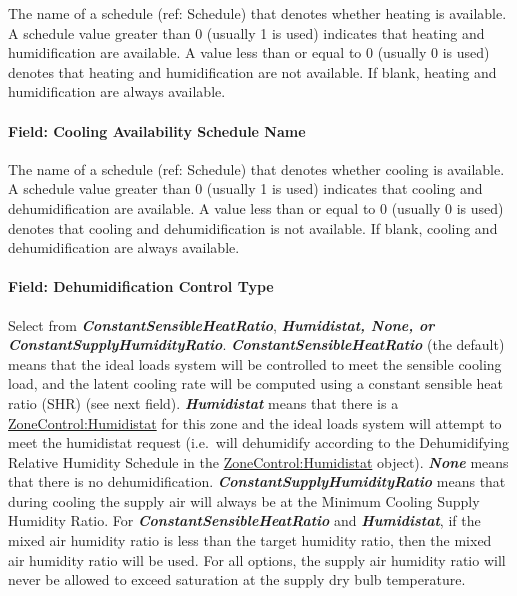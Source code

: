 The name of a schedule (ref: Schedule) that denotes whether heating is available. A schedule value greater than 0 (usually 1 is used) indicates that heating and humidification are available. A value less than or equal to 0 (usually 0 is used) denotes that heating and humidification are not available. If blank, heating and humidification are always available.

\paragraph{Field: Cooling Availability Schedule Name}\label{field-cooling-availability-schedule-name-001}

The name of a schedule (ref: Schedule) that denotes whether cooling is available. A schedule value greater than 0 (usually 1 is used) indicates that cooling and dehumidification are available. A value less than or equal to 0 (usually 0 is used) denotes that cooling and dehumidification is not available. If blank, cooling and dehumidification are always available.

\paragraph{Field: Dehumidification Control Type}\label{field-dehumidification-control-type-002}

Select from \textbf{\emph{ConstantSensibleHeatRatio}}, \textbf{\emph{Humidistat, None, or ConstantSupplyHumidityRatio}}. \textbf{\emph{ConstantSensibleHeatRatio}} (the default) means that the ideal loads system will be controlled to meet the sensible cooling load, and the latent cooling rate will be computed using a constant sensible heat ratio (SHR) (see next field). \textbf{\emph{Humidistat}} means that there is a \hyperref[zonecontrolhumidistat]{ZoneControl:Humidistat} for this zone and the ideal loads system will attempt to meet the humidistat request (i.e.~will dehumidify according to the Dehumidifying Relative Humidity Schedule in the \hyperref[zonecontrolhumidistat]{ZoneControl:Humidistat} object). \textbf{\emph{None}} means that there is no dehumidification. \textbf{\emph{ConstantSupplyHumidityRatio}} means that during cooling the supply air will always be at the Minimum Cooling Supply Humidity Ratio. For \textbf{\emph{ConstantSensibleHeatRatio}} and \textbf{\emph{Humidistat}}, if the mixed air humidity ratio is less than the target humidity ratio, then the mixed air humidity ratio will be used. For all options, the supply air humidity ratio will never be allowed to exceed saturation at the supply dry bulb temperature.

